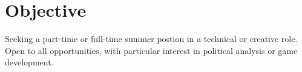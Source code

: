 \documentclass[letterpaper]{twentysecondcv} %
\begin{document}





\skillstext{}


\makeprofile %


\section{Objective}


Seeking a part-time or full-time summer postion in a technical or creative role. Open to all opportunities, with particular interest in political analysis or game development.


   

\vspace{32pt} %

\end{document}
